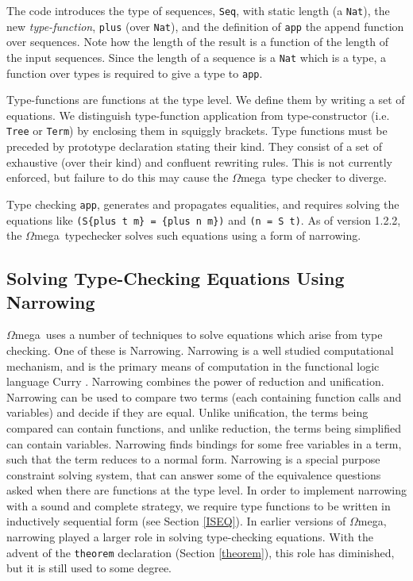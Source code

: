 \documentclass[11pt,twoside]{article}
\newcommand{\om}{$\Omega$mega}
\begin{document}
The code introduces the type of sequences, {\tt Seq}, with static length
(a {\tt Nat}), the new {\em type-function}, {\tt plus} (over {\tt Nat}),
and the definition of {\tt app} the append function
over sequences. Note how the length of the result is a function
of the length of the input sequences. Since the length of a sequence is
a {\tt Nat} which is a type, a function over types is required
to give a type to {\tt app}. 

Type-functions are functions at the type level. We define them by
writing a set of equations. We distinguish type-function application
from type-constructor (i.e. {\tt Tree} or {\tt Term}) by enclosing them
in squiggly brackets. Type functions must be preceded by prototype
declaration stating their kind. They consist of a set of exhaustive
(over their kind) and confluent rewriting rules.
This is not currently
enforced, but failure to do this may cause the \om\ type checker to
diverge.

Type checking {\tt app}, generates and propagates equalities, and requires
solving the equations like {\tt (S\{plus t m\} = \{plus n m\})} and {\tt (n =
S t)}. As of version 1.2.2, the \om\ typechecker solves such equations using a
form of narrowing.

\subsection{Solving Type-Checking Equations Using Narrowing}

\om\ uses a number of techniques to solve equations which arise from
type checking. One of these is Narrowing.
Narrowing is a well studied computational mechanism, and is the primary means of
computation in the functional logic language Curry
\cite{Hanus06Curry,journals/jflp/HanusS99}. Narrowing combines the power of reduction
and unification. Narrowing can be used to compare
two terms (each containing function calls and variables)
and decide if they are equal. Unlike unification, the terms being compared can contain functions,
and unlike reduction, the terms being simplified can contain variables. Narrowing
finds bindings for some free variables in a term, such that the term reduces to a
normal form. Narrowing is a special purpose constraint solving system, 
that can answer some of the equivalence questions asked when there are functions at the type
level. In order to implement narrowing with a sound and complete strategy, we require
type functions to be written in inductively sequential form (see Section \ref{ISEQ}).
In earlier versions of \om, narrowing played a larger role
in solving type-checking equations. With the advent of the
{\tt theorem} declaration (Section \ref{theorem}), this role has
diminished, but it is still used to some degree.
\end{document}
